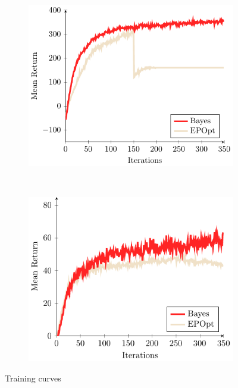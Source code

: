 \documentclass{article}
\begin{document}
\begin{figure}[t!]
\begin{centering}
\begin{subfigure}[b]{0.38\columnwidth}
\includegraphics[width=\linewidth]{figs/cheetah_training_curves.pdf}
\end{subfigure}
~
\begin{subfigure}[b]{0.38\columnwidth}
\includegraphics[width=\linewidth]{figs/swimmer_training_curves.pdf}
\end{subfigure}
\end{centering}
\caption{Training curves}
\end{figure}
\end{document}
